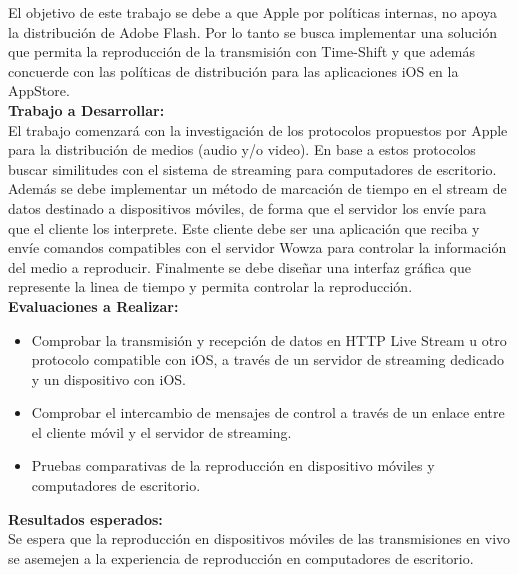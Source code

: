 El objetivo de este trabajo se debe a que Apple por políticas internas, no apoya la distribuci\'on de Adobe Flash. Por lo tanto se busca implementar una soluci\'on que permita la reproducci\'on de la transmisi\'on con Time-Shift y que adem\'as concuerde con las pol\'iticas de distribuci\'on para las aplicaciones iOS en la AppStore.\\
 
\large
\textbf{Trabajo a Desarrollar:}\\

\normalsize
El trabajo comenzar\'a con la investigaci\'on de los protocolos propuestos por Apple para la distribuci\'on de medios (audio y/o video). En base a estos protocolos buscar similitudes con el sistema de streaming para computadores de escritorio. Adem\'as se debe implementar un m\'etodo de marcaci\'on de tiempo en el stream de datos destinado a dispositivos m\'oviles, de forma que el servidor los env\'ie para que el cliente los interprete. Este cliente debe ser una aplicaci\'on que reciba y env\'ie comandos compatibles con el servidor Wowza para controlar la informaci\'on del medio a reproducir. Finalmente se debe dise\~nar una interfaz gr\'afica que represente la linea de tiempo y permita controlar la reproducción.\\

\textbf{Evaluaciones a Realizar:}
\normalsize
\begin{itemize}
\item	Comprobar la transmisión y recepción de datos en HTTP Live Stream u otro protocolo compatible con iOS, a través de un servidor de streaming dedicado y un dispositivo con iOS.
\item	Comprobar el intercambio de mensajes de control a través de un enlace entre el cliente móvil y el servidor de streaming.
\item	Pruebas comparativas de la reproducción en dispositivo móviles y computadores de escritorio.
\end{itemize}

\textbf{Resultados esperados:}\\
\normalsize
Se espera que la reproducción en dispositivos móviles de las transmisiones en vivo se asemejen a la experiencia de reproducción en computadores de escritorio.\\

